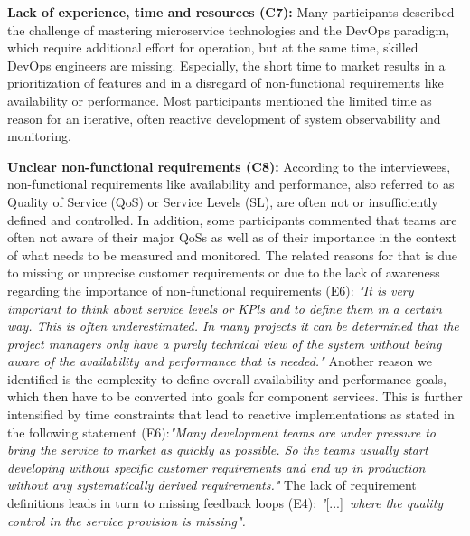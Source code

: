 \documentclass[runningheads]{llncs}
\begin{document}
\textbf{Lack of experience, time and resources (C7):}
Many participants described the challenge of mastering microservice technologies and the DevOps paradigm, which require additional effort for operation, but at the same time, skilled DevOps engineers are missing. Especially, the short time to market results in a prioritization of features and in a disregard of non-functional requirements like availability or performance. Most participants mentioned the limited time as reason for an iterative, often reactive development of system observability and monitoring.

\textbf{Unclear non-functional requirements (C8):}
According to the interviewees, non-functional requirements like availability and performance, also referred to as Quality of Service (QoS) or Service Levels (SL), are often not or insufficiently defined and controlled. In addition, some participants commented that teams are often not aware of their major QoSs as well as of their importance in the context of what needs to be measured and monitored. The related reasons for that is due to missing or unprecise customer requirements or due to the lack of awareness regarding the importance of non-functional requirements (E6):\textit{ "It is very important to think about service levels or KPls and to define them in a certain way. This is often underestimated. In many projects it can be determined that the project managers only have a purely technical view of the system without being aware of the availability and performance that is needed."} Another reason we identified is the complexity to define overall availability and performance goals, which then have to be converted into goals for component services. This is further intensified by time constraints that lead to reactive implementations as stated in the following statement (E6):\textit{"Many development teams are under pressure to bring the service to market as quickly as possible. So the teams usually start developing without specific customer requirements and end up in production without any systematically derived requirements."} The lack of requirement definitions leads in turn to missing feedback loops (E4): \textit{"}[...]~\textit{where the quality control in the service provision is missing". }
\end{document}
